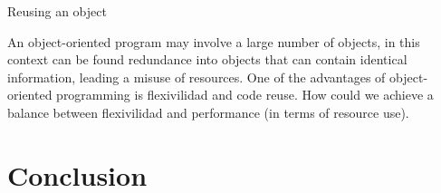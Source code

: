 \documentclass{sig-alternate}
\newcommand{\seclabel}[1]{\label{sec:#1}}
\begin{document}
Reusing an object

An object-oriented program may involve a large number of objects, in this context  can be found redundance into objects that can contain identical information, leading a misuse of resources. 
One of the advantages of object-oriented programming is flexivilidad and code reuse. 
How could we achieve a balance between flexivilidad and performance (in terms of resource use).


\section{Conclusion}\seclabel{conclusion}




\end{document}
